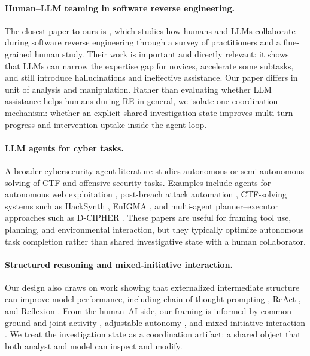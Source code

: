 \documentclass[letterpaper]{article}
\begin{document}
\paragraph{Human--LLM teaming in software reverse engineering.}
The closest paper to ours is \citet{basque2026decompiling}, which studies how humans and LLMs collaborate during software reverse engineering through a survey of practitioners and a fine-grained human study.
Their work is important and directly relevant: it shows that LLMs can narrow the expertise gap for novices, accelerate some subtasks, and still introduce hallucinations and ineffective assistance.
Our paper differs in unit of analysis and manipulation.
Rather than evaluating whether LLM assistance helps humans during RE in general, we isolate one coordination mechanism: whether an explicit shared investigation state improves multi-turn progress and intervention uptake inside the agent loop.

\paragraph{LLM agents for cyber tasks.}
A broader cybersecurity-agent literature studies autonomous or semi-autonomous solving of CTF and offensive-security tasks.
Examples include agents for autonomous web exploitation \citep{fang2024hackwebsites, fang2024oneday}, post-breach attack automation \citep{xu2024autoattacker}, CTF-solving systems such as HackSynth \citep{muzsai2024hacksynth}, EnIGMA \citep{abramovich2024enigma}, and multi-agent planner--executor approaches such as D-CIPHER \citep{udeshi2025dcipher}.
These papers are useful for framing tool use, planning, and environmental interaction, but they typically optimize autonomous task completion rather than shared investigative state with a human collaborator.

\paragraph{Structured reasoning and mixed-initiative interaction.}
Our design also draws on work showing that externalized intermediate structure can improve model performance, including chain-of-thought prompting \citep{wei2022chain}, ReAct \citep{yao2023react}, and Reflexion \citep{shinn2023reflexion}.
From the human--AI side, our framing is informed by common ground and joint activity \citep{clark1996using, johnson2014coactive}, adjustable autonomy \citep{bradshaw2004making}, and mixed-initiative interaction \citep{horvitz1999principles}.
We treat the investigation state as a coordination artifact: a shared object that both analyst and model can inspect and modify.
\end{document}
